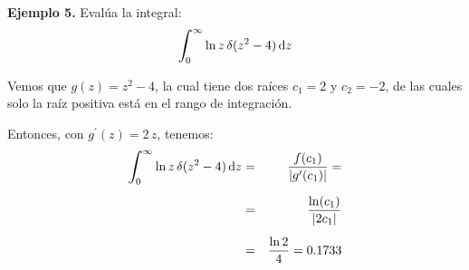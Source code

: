 \documentclass[12pt]{article}
\newcommand{\ptilde}[1]{\ensuremath{{#1}^{\prime}}}
\def\scaleint#1{\vcenter{\hbox{\scaleto[3ex]{\displaystyle\int}{#1}}}}
\def\bs{\mkern-12mu}
\numberwithin{equation}{section}
\begin{document}
\noindent
\textbf{Ejemplo 5. } Evalúa la integral:
\begin{align*}
\scaleint{6ex}_{\bs 0}^{\infty} \ln z \, \delta (z^{2} - 4 ) \dd{z}
\end{align*}

Vemos que $g(z) = z^{2} - 4$, la cual tiene dos raíces $c_{1} = 2$ y $c_{2} = -2$, de las cuales solo la raíz positiva está en el rango de integración.

Entonces, con $\ptilde{g}(z) = 2 \, z$, tenemos:
\begin{eqnarray*}
\scaleint{6ex}_{\bs 0}^{\infty} \ln z \, \delta (z^{2} - 4 ) \dd{z} &=& \dfrac{f(c_{1})}{\abs{\ptilde{g}(c_{1})}} = \\[0.5em] 
&=& \dfrac{\ln (c_{1})}{\abs{2 c_{1}}} \\[0.5em] 
&=& \dfrac{\ln 2}{4} =  0.1733
\end{eqnarray*}
    
\end{document}
